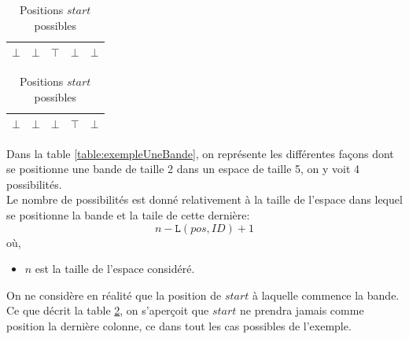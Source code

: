\documentclass[a4paper,12pt]{report}
\newcommand\grey{\cellcolor{black!50}}
\begin{document}
\begin{table}[H]
\begin{subtable}[B]{0.5\textwidth}
			\begin{tabular}{|c|c|c|c|c|}
			\hline 
			$\bot$ & $\bot$ & \grey $\top$  & $\bot$ & $\bot$ \\ 
			\hline
			\end{tabular}

			\begin{tabular}{|c|c|c|c|c|}
			\hline 
			$\bot$ & $\bot$ & $\bot$ & \grey $\top$ & $\bot$\\ 
			\hline
			\end{tabular}
			
        \caption{Positions $start$ possibles}
        \label{table:PosPossible}
    \end{subtable}
\end{table}

Dans la table \ref{table:exempleUneBande}, on représente les différentes façons dont se positionne une bande de taille 2 dans un espace de taille 5, on y voit 4 possibilités.\\
Le nombre de possibilités est donné relativement à la taille de l'espace dans lequel se positionne la bande et la taile de cette dernière:
$$n-\mathtt{L}(pos,ID)+1$$
où,
\begin{itemize}
\item[] $n$ est la taille de l'espace considéré.\\
\end{itemize}
On ne considère en réalité que la position de $start$ à laquelle commence la bande. Ce que décrit la table \ref{table:PosPossible}, on s'aperçoit que $start$ ne prendra jamais comme position la dernière colonne, ce dans tout les cas possibles de l'exemple. 
\end{document}
